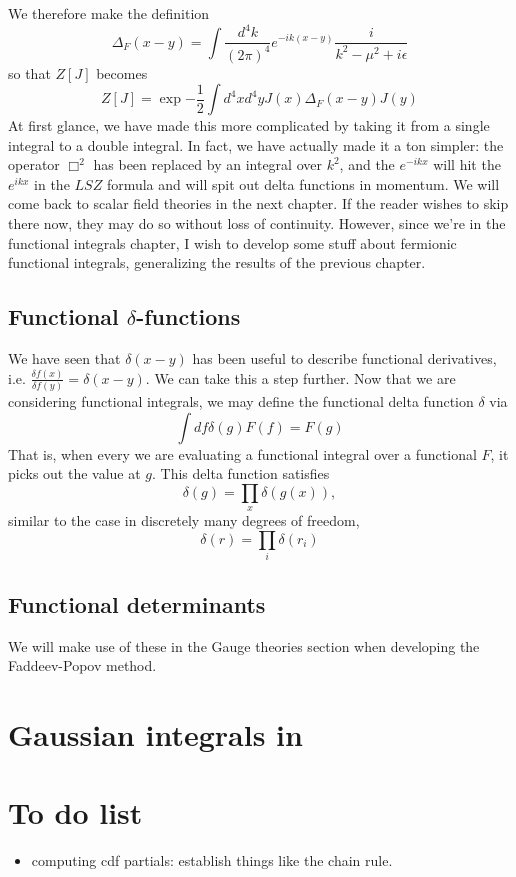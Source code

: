 \documentclass[main.tex]{subfiles}
\begin{document}
We therefore make the definition
\[
\Delta_F (x - y) = \int \frac{d^4 k}{(2\pi)^4}e^{-ik(x-y)} \frac{i}{k^2 - \mu^2 + i \epsilon}
\]
so that $Z[J]$ becomes
\[
Z[J]= \exp{-\frac{1}{2} \int d^4 x d^4 y J(x) \Delta_F (x-y) J(y)}
\]
At first glance, we have made this more complicated by taking it from a single integral to a double integral. In fact, we have actually made it a ton simpler: the operator $\Box^2$ has been replaced by an integral over $k^2$, and the $e^{-ikx}$ will hit the $e^{ikx}$ in the $LSZ$ formula and will spit out delta functions in momentum. We will come back to scalar field theories in the next chapter. If the reader wishes to skip there now, they may do so without loss of continuity. However, since we're in the functional integrals chapter, I wish to develop some stuff about fermionic functional integrals, generalizing the results of the previous chapter. 

\subsection{Functional $\delta$-functions}
We have seen that $\delta(x-y)$ has been useful to describe functional derivatives, i.e. $\frac{\delta f(x)}{\delta f(y)} = \delta(x-y)$. We can take this a step further. Now that we are considering functional integrals, we may define the functional delta function $\delta$ via
\[
\int df \delta(g) F(f) = F(g)
\]
That is, when every we are evaluating a functional integral over a functional $F$, it picks out the value at $g$. This delta function satisfies
\[
\delta(g) = \prod_x \delta(g(x)),
\]
similar to the case in discretely many degrees of freedom,
\[
\delta(r) = \prod_i \delta(r_i)
\]
\subsection{Functional determinants}
We will make use of these in the Gauge theories section when developing the Faddeev-Popov method.

\section{Gaussian integrals in }
\section{To do list}
\begin{itemize}
\item computing cdf partials: establish things like the chain rule.
\end{itemize}
\end{document}
